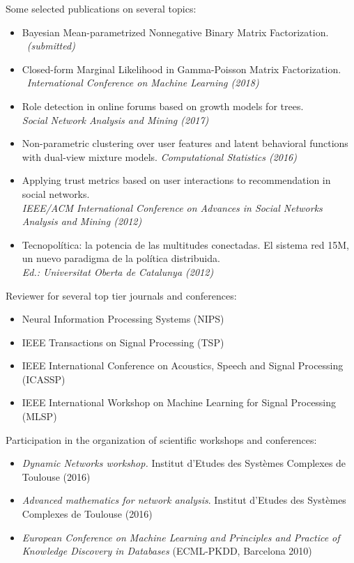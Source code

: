 \documentclass[paper=a4,fontsize=11pt]{temp} %
\begin{document}
\noindent{}


Some selected publications on several topics:
\begin{itemize}[leftmargin=*]
\item Bayesian Mean-parametrized Nonnegative Binary Matrix Factorization. \\\ \textit{(submitted)}
\item Closed-form Marginal Likelihood in Gamma-Poisson Matrix Factorization. \\\ \textit{International Conference on Machine Learning (2018)}
\item Role detection in online forums based on growth models for trees. \\\textit{Social Network Analysis and Mining (2017)}
\item Non-parametric clustering over user features and latent behavioral functions with dual-view mixture models. \textit{Computational Statistics (2016)}
\item Applying trust metrics based on user interactions to recommendation in social networks. \\\textit{IEEE/ACM International Conference on Advances in Social Networks Analysis and Mining (2012)} 
\item Tecnopolítica: la potencia de las multitudes conectadas. El sistema red 15M, un nuevo paradigma de la política distribuida. \\\textit{Ed.: Universitat Oberta de Catalunya (2012)}
\end{itemize}
\vspace{-0.25cm}             

Reviewer for several top tier journals and conferences:
\begin{itemize}[leftmargin=*]
\setlength\itemsep{0.0em}
\item Neural Information Processing Systems (NIPS)
\item IEEE Transactions on Signal Processing (TSP)
\item IEEE International Conference on Acoustics, Speech and Signal Processing (ICASSP)
\item  IEEE International Workshop on Machine Learning for Signal Processing (MLSP)
\end{itemize}
Participation in the organization of scientific workshops and conferences:
\begin{itemize}[leftmargin=*]
\setlength\itemsep{0.0em}
\item \textit{Dynamic Networks workshop.} Institut d'Etudes des Systèmes Complexes de Toulouse (2016)
\item \textit{Advanced mathematics for network analysis}. Institut d'Etudes des Systèmes Complexes de Toulouse (2016)
\item \textit{European Conference on Machine Learning and Principles and Practice of Knowledge Discovery in Databases} (ECML-PKDD, Barcelona 2010)
\end{itemize}
\vspace{-0.25cm}             
\end{document}
